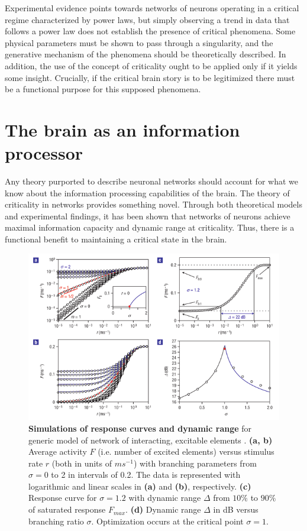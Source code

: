 \documentclass[12pt]{article}
\begin{document}
Experimental evidence points towards networks of neurons operating in a critical regime characterized by power laws, but simply observing a trend in data that follows a power law does not establish the presence of critical phenomena. Some physical parameters must be shown to pass through a singularity, and the generative mechanism of the phenomena should be theoretically described. In addition, the use of the concept of criticality ought to be applied only if it yields some insight. Crucially, if the critical brain story is to be legitimized there must be a functional purpose for this supposed phenomena. 
      
\section*{The brain as an information processor}

Any theory purported to describe neuronal networks should account for what we know about the information processing capabilities of the brain. The theory of criticality in networks provides something novel. Through both theoretical models and experimental findings, it has been shown that networks of neurons achieve maximal information capacity and dynamic range at criticality. Thus, there is a functional benefit to maintaining a critical state in the brain.

\begin{figure}      
  \begin{center}    
 \includegraphics[width=1\textwidth]{dynamicrangetheorycopelli}    
    \caption{\textbf{Simulations of response curves and dynamic range} for generic model of network of interacting, excitable elements \cite{Kinouchi2006b}. \textbf{(a, b)} Average activity $F$ (i.e. number of excited elements) versus stimulus rate $r$ (both in units of $ms^{-1}$) with branching parameters from $\sigma = 0$ to 2 in intervals of 0.2. The data is represented with logarithmic and linear scales in \textbf{(a)} and \textbf{(b)}, respectively. \textbf{(c)} Response curve for $\sigma = 1.2$ with dynamic range $\Delta$ from $10\%$ to $90\%$ of saturated response $F_{max}$. \textbf{(d)} Dynamic range $\Delta$ in dB versus branching ratio $\sigma$. Optimization occurs at the critical point $\sigma = 1$.}
   \label{Figure::Dynamic Range Theory}   
  \end{center}     
   \end{figure}
   
\end{document}
